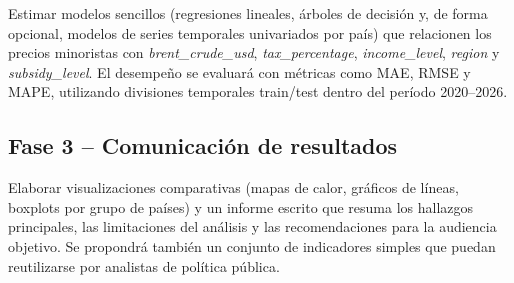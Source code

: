 \documentclass[stu, 12pt, a4paper, biblatex, donotrepeattitle]{apa7}
\begin{document}
Estimar modelos sencillos (regresiones lineales, árboles de decisión y, de forma opcional, modelos de series temporales univariados por país) que relacionen los precios minoristas con \textit{brent\_crude\_usd}, \textit{tax\_percentage}, \textit{income\_level}, \textit{region} y \textit{subsidy\_level}. El desempeño se evaluará con métricas como MAE, RMSE y MAPE, utilizando divisiones temporales train/test dentro del período 2020--2026.

\subsection{Fase 3 -- Comunicación de resultados}

Elaborar visualizaciones comparativas (mapas de calor, gráficos de líneas, boxplots por grupo de países) y un informe escrito que resuma los hallazgos principales, las limitaciones del análisis y las recomendaciones para la audiencia objetivo. Se propondrá también un conjunto de indicadores simples que puedan reutilizarse por analistas de política pública.

\nocite{kilian2008}
\printbibliography
\end{document}

